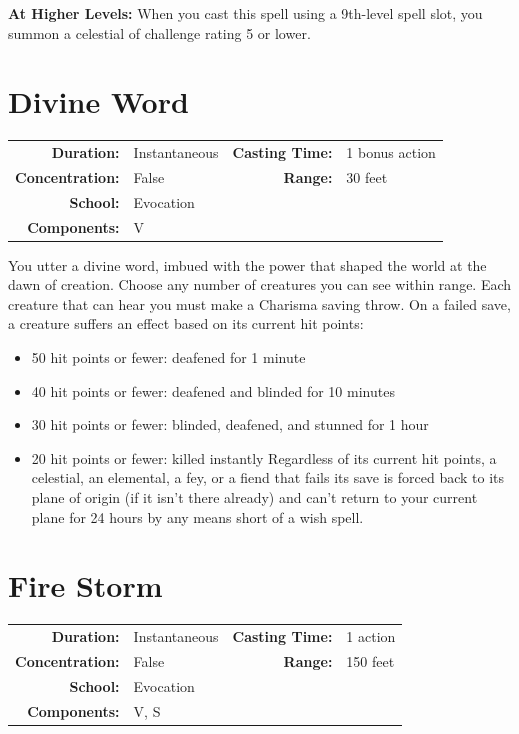 \documentclass[12pt,showtrims]{memoir}
\begin{document}
\vspace{8pt} \noindent\textbf{At Higher Levels:} When you cast this spell using a 9th-level spell slot, you summon a celestial of challenge rating 5 or lower.
\newpage
\section*{Divine Word}

{
\small\centering\vspace{-6pt}
\begin{tabular}{rlrl}
\toprule

\textbf{Duration:} & Instantaneous &
\textbf{Casting Time:} & 1 bonus action \\
\textbf{Concentration:} & False &
\textbf{Range:} & 30 feet \\
\textbf{School:} & Evocation \\
\textbf{Components:} & \multicolumn{3}{p{0.7\textwidth}}{V}\\

\bottomrule
\end{tabular}
}

\vspace{1\baselineskip}\noindent You utter a divine word, imbued with the power that shaped the world at the dawn of creation. Choose any number of creatures you can see within range. Each creature that can hear you must make a Charisma saving throw. On a failed save, a creature suffers an effect based on its current hit points:
\begin{itemize}
    \item 50 hit points or fewer: deafened for 1 minute
    \item 40 hit points or fewer: deafened and blinded for 10 minutes
    \item 30 hit points or fewer: blinded, deafened, and stunned for 1 hour
    \item 20 hit points or fewer: killed instantly Regardless of its current hit points, a celestial, an elemental, a fey, or a fiend that fails its save is forced back to its plane of origin (if it isn't there already) and can't return to your current plane for 24 hours by any means short of a wish spell.
\end{itemize}


\newpage
\section*{Fire Storm}

{
\small\centering\vspace{-6pt}
\begin{tabular}{rlrl}
\toprule

\textbf{Duration:} & Instantaneous &
\textbf{Casting Time:} & 1 action \\
\textbf{Concentration:} & False &
\textbf{Range:} & 150 feet \\
\textbf{School:} & Evocation \\
\textbf{Components:} & \multicolumn{3}{p{0.7\textwidth}}{V, S}\\

\bottomrule
\end{tabular}
}
\end{document}
